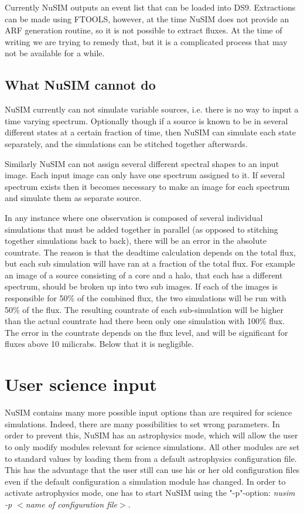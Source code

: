 Currently NuSIM outputs an event list that can be loaded into DS9. Extractions can be made using FTOOLS, however, at the time NuSIM does not provide an ARF generation routine, so it is not possible to extract fluxes. At the time of writing we are trying to remedy that, but it is a complicated process that may not be available for a while.

\subsection{What NuSIM cannot do}
NuSIM currently can not simulate variable sources, i.e. there is no way to input a time varying spectrum. Optionally though if a source is known to be in several different states at a certain fraction of time, then NuSIM can simulate each state separately, and the simulations can be stitched together afterwards.

Similarly NuSIM can not assign several different spectral shapes to an input image. Each input image can only have one spectrum assigned to it. If several spectrum exists then it becomes necessary to make an image for each spectrum and simulate them as separate source.

In any instance where one observation is composed of several individual simulations that must be added together in parallel (as opposed to stitching together simulations back to back), there will be an error in the absolute countrate. The reason is that the deadtime calculation depends on the total flux, but each sub simulation will have ran at a fraction of the total flux. For example an image of a source consisting of a core and a halo, that each has a different spectrum, should be broken up into two sub images. If each of the images is responsible for 50\% of the combined flux, the two simulations will be run with 50\% of the flux. The resulting countrate of each sub-simulation will be higher than the actual countrate had there been only one simulation with 100\% flux. The error in the countrate depends on the flux level, and will be significant for fluxes above 10 milicrabs. Below that it is negligible.  


\section{User science input}

NuSIM contains many more possible input options than are required for science simulations. 
Indeed, there are many possibilities to set wrong parameters.
In order to prevent this, NuSIM has an astrophysics mode, which will allow the user to only modify modules relevant for science simulations.
All other modules are set to standard values by loading them from a default astrophysics configuration file.
This has the advantage that the user still can use his or her old configuration files even if the default configuration a simulation module has changed.
In order to activate astrophysics mode, one has to start NuSIM using the "-p"-option: \emph{nusim -p $<$name of configuration file$>$}. 

